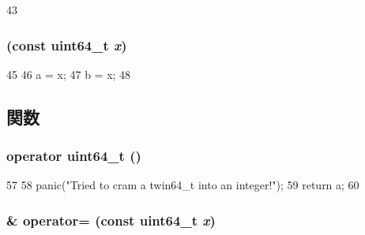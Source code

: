 \begin{DoxyCode}
43     {}
\end{DoxyCode}
\hypertarget{structm5__twin64__t_af388e832cd78c1de8d111b154b1614e1}{
\subsubsection[{m5\_\-twin64\_\-t}]{ (const uint64\_\-t {\em x})}}
\label{structm5__twin64__t_af388e832cd78c1de8d111b154b1614e1}



\begin{DoxyCode}
45     {
46         a = x;
47         b = x;
48     }
\end{DoxyCode}


\subsection{関数}
\hypertarget{structm5__twin64__t_a1ba17e534ee6d9b9826f92bf6a5fce71}{
\subsubsection[{operator uint64\_\-t}]{\setlength{\rightskip}{0pt plus 5cm}operator uint64\_\-t ()}}
\label{structm5__twin64__t_a1ba17e534ee6d9b9826f92bf6a5fce71}



\begin{DoxyCode}
57     {
58         panic("Tried to cram a twin64_t into an integer!\n");
59         return a;
60     }
\end{DoxyCode}
\hypertarget{structm5__twin64__t_a9e502b0d4646a8e82491a77ae19698c8}{
\subsubsection[{operator=}]{\& operator= (const uint64\_\-t {\em x})}}
\label{structm5__twin64__t_a9e502b0d4646a8e82491a77ae19698c8}



